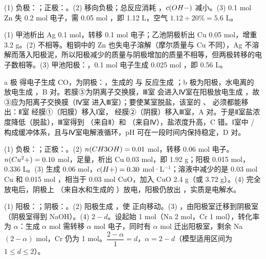 \begin{jiexilist}
\item (1) 负极：；正极：。(2) 移向负极；总反应消耗 ，$c(OH-)$ 减小。(3) 0.1 mol Zn 失 0.2 mol 电子，需 0.05 mol ，即 1.12 L，空气 $1.12\div20\%=5.6$ L。
\item (1) 甲池析出 Ag 0.1 mol，转移 0.1 mol 电子；乙池阴极析出 Cu 0.05 mol，增重 3.2 g。(2) 不相等。粗铜中的 Zn 也失电子溶解（摩尔质量与 Cu 不同），Ag 不溶解而落入阳极泥，所以阳极减少的质量与阴极增加的质量不相等，但两极转移的电子数相等。(3) 甲池阳极：，0.1 mol 电子生成 0.025 mol ，即 0.56 L。
\item {}a 极  得电子生成 CO，为阴极：，生成的  与  反应生成 ；b 极为阳极，水电离的  放电生成 ，B 对。若膜③为阴离子交换膜，Ⅲ室  会进入Ⅳ室在阳极放电生成 ，故③应为阳离子交换膜（Ⅳ室  进入Ⅲ室）；要使某室脱盐，该室的 、 必须都能移出：Ⅱ室  经膜①（阳膜）移入Ⅰ室， 经膜②（阴膜）移入Ⅲ室，A 对。于是Ⅱ室盐浓度降低（脱盐），Ⅲ室得到 （来自Ⅱ）和 （来自Ⅳ），盐浓度升高，C 错。Ⅰ室中 / 构成缓冲体系，且与Ⅳ室电解液循环，pH 可在一段时间内保持稳定，D 对。
\item (1) 负极：；正极：。(2) $n(CH3OH)=0.01$ mol，转移 0.06 mol 电子。$n(Cu^2+)=0.10$ mol，足量，析出 Cu 0.03 mol，即 1.92 g；阳极  0.015 mol，0.336 L。(3) 生成  0.06 mol，$c(H+)=0.30$ mol·L$^{-1}$；溶液中减少的是 0.03 mol Cu 和 0.015 mol ，相当于 0.03 mol CuO，加入 CuO 2.4 g（或  3.72 g）。(4)  完全放电后，阴极上 （来自水和生成的 ）放电，阳极仍放出 ，实质是电解水。
\item (1) 阳极：；阴极：。(2) 阳极生成 ，使  正向移动。(3) ，由阳极室迁移到阴极室（阴极室得到 NaOH）。(4) $2-d$。设起始  1 mol（Na 2 mol，Cr 1 mol），转化率为 $\alpha$：生成 $\alpha$ mol  需转移 $\alpha$ mol 电子，同时有 $\alpha$ mol  迁出阳极室，剩余 Na $(2-\alpha)$ mol，Cr 仍为 1 mol。$\dfrac{2-\alpha}{1}=d$，$\alpha=2-d$（模型适用区间为 $1\le d\le2$）。
\end{jiexilist}
